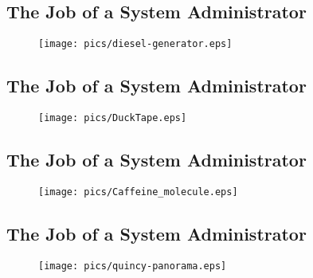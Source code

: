\documentclass[xga]{xdvislides}
\begin{document}
\subsection{The Job of a System Administrator}
\vspace*{\fill}
\begin{figure}[hb]
	\begin{center}
		\texttt{[image: pics/diesel-generator.eps]} \\
	\end{center}
\end{figure}
\vspace*{\fill}

\subsection{The Job of a System Administrator}
\vspace*{\fill}
\begin{figure}[hb]
	\begin{center}
		\texttt{[image: pics/DuckTape.eps]} \\
	\end{center}
\end{figure}
\vspace*{\fill}

\subsection{The Job of a System Administrator}
\vspace*{\fill}
\begin{figure}[hb]
	\begin{center}
		\texttt{[image: pics/Caffeine\_molecule.eps]} \\
	\end{center}
\end{figure}
\vspace*{\fill}

\subsection{The Job of a System Administrator}
\vspace*{\fill}
\begin{figure}[hb]
	\begin{center}
		\texttt{[image: pics/quincy-panorama.eps]} \\
	\end{center}
\end{figure}
\vspace*{\fill}
\end{document}
